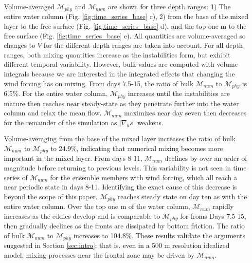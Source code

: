 \documentclass[draft]{agujournal2019}
\begin{document}
Volume-averaged $\mathcal{M}_{phy}$ and $\mathcal{M}_{num}$ are shown for three depth ranges: 1) The entire water column (Fig. \ref{fig:time_series_base} c), 2) from the base of the mixed layer to the free surface (Fig. \ref{fig:time_series_base} d), and the top one m to the free surface (Fig. \ref{fig:time_series_base} e). All quantities are volume-averaged so changes to $V$ for the different depth ranges are taken into account. For all depth ranges, both mixing quantities increase as the instabilities form, but exhibit different temporal variability. However, bulk values are computed with volume-integrals because we are interested in the integrated effects that changing the wind forcing has on mixing. From days 7.5-15, the ratio of bulk $\mathcal{M}_{num}$ to $\mathcal{M}_{phy}$ is 6.5\%. For the entire water column, $\mathcal{M}_{phy}$ increases until the instabilities are mature then reaches near steady-state as they penetrate further into the water column and relax the mean flow. $\mathcal{M}_{num}$ maximizes near day seven then decreases for the remainder of the simulation as $|\nabla_h s|$ weakens.

Volume-averaging from the base of the mixed layer increases the ratio of bulk $\mathcal{M}_{num}$ to $\mathcal{M}_{phy}$ to 24.9\%, indicating that numerical mixing becomes more important in the mixed layer. From days 8-11, $\mathcal{M}_{num}$ declines by over an order of magnitude before returning to previous levels. This variability is not seen in time series of $\mathcal{M}_{num}$ for the ensemble members with wind forcing, which all reach a near periodic state in days 8-11. Identifying the exact cause of this decrease is beyond the scope of this paper. $\mathcal{M}_{phy}$ reaches steady state on day ten as with the entire water column. Over the top one m of the water column, $\mathcal{M}_{num}$ rapidly increases as the eddies develop and is comparable to $\mathcal{M}_{phy}$ for froms Days 7.5-15, then gradually declines as the fronts are dissipated by bottom friction. The ratio of bulk $\mathcal{M}_{num}$ to $\mathcal{M}_{phy}$ increases to 104.8\%. These results validate the arguments suggested in Section \ref{sec:intro}; that is, even in a 500 m resolution idealized model, mixing processes near the frontal zone may be driven by $\mathcal{M}_{num}$. 
\end{document}
